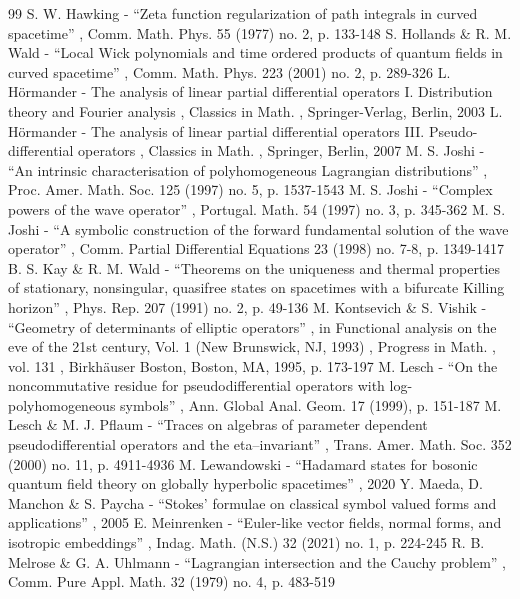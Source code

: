 \documentclass[10pt]{amsart}
\theoremstyle{definition}
\begin{document}
\begin{thebibliography}{99}
 S. W. Hawking - “Zeta function regularization of path integrals in curved spacetime” , Comm. Math. Phys. 55 (1977) no. 2, p. 133-148
 S. Hollands \& R. M. Wald - “Local Wick polynomials and time ordered products of quantum fields in curved spacetime” , Comm. Math. Phys. 223 (2001) no. 2, p. 289-326
 L. Hörmander - The analysis of linear partial differential operators I. Distribution theory and Fourier analysis , Classics in Math. , Springer-Verlag, Berlin, 2003
 L. Hörmander - The analysis of linear partial differential operators III. Pseudo-differential operators , Classics in Math. , Springer, Berlin, 2007
 M. S. Joshi - “An intrinsic characterisation of polyhomogeneous Lagrangian distributions” , Proc. Amer. Math. Soc. 125 (1997) no. 5, p. 1537-1543
 M. S. Joshi - “Complex powers of the wave operator” , Portugal. Math. 54 (1997) no. 3, p. 345-362
 M. S. Joshi - “A symbolic construction of the forward fundamental solution of the wave operator” , Comm. Partial Differential Equations 23 (1998) no. 7-8, p. 1349-1417
 B. S. Kay \& R. M. Wald - “Theorems on the uniqueness and thermal properties of stationary, nonsingular, quasifree states on spacetimes with a bifurcate Killing horizon” , Phys. Rep. 207 (1991) no. 2, p. 49-136
 M. Kontsevich \& S. Vishik - “Geometry of determinants of elliptic operators” , in Functional analysis on the eve of the 21st century, Vol. 1 (New Brunswick, NJ, 1993) , Progress in Math. , vol. 131 , Birkhäuser Boston, Boston, MA, 1995, p. 173-197
 M. Lesch - “On the noncommutative residue for pseudodifferential operators with log-polyhomogeneous symbols” , Ann. Global Anal. Geom. 17 (1999), p. 151-187
 M. Lesch \& M. J. Pflaum - “Traces on algebras of parameter dependent pseudodifferential operators and the eta–invariant” , Trans. Amer. Math. Soc. 352 (2000) no. 11, p. 4911-4936
 M. Lewandowski - “Hadamard states for bosonic quantum field theory on globally hyperbolic spacetimes” , 2020
 Y. Maeda, D. Manchon \& S. Paycha - “Stokes’ formulae on classical symbol valued forms and applications” , 2005
 E. Meinrenken - “Euler-like vector fields, normal forms, and isotropic embeddings” , Indag. Math. (N.S.) 32 (2021) no. 1, p. 224-245
 R. B. Melrose \& G. A. Uhlmann - “Lagrangian intersection and the Cauchy problem” , Comm. Pure Appl. Math. 32 (1979) no. 4, p. 483-519

\end{thebibliography}
\end{document}
